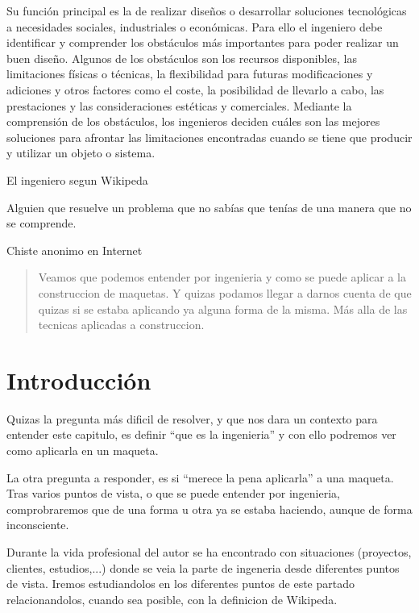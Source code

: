 

\epigraph{Su función principal es la de realizar diseños o desarrollar soluciones
    tecnológicas a necesidades sociales, industriales o económicas.
    Para ello el ingeniero debe identificar y comprender los obstáculos más importantes
    para poder realizar un buen diseño. Algunos de los obstáculos son los recursos disponibles,
    las limitaciones físicas o técnicas, la flexibilidad para futuras modificaciones y
    adiciones y otros factores como el coste, la posibilidad de llevarlo a cabo, las
    prestaciones y las consideraciones estéticas y comerciales. Mediante la comprensión de
    los obstáculos, los ingenieros deciden cuáles son las mejores soluciones para afrontar
    las limitaciones encontradas cuando se tiene que producir y utilizar un objeto o sistema.}
{El ingeniero segun Wikipeda}

\epigraph{Alguien que resuelve un problema que no sabías que tenías de una manera
    que no se comprende.}{Chiste anonimo en Internet}

\begin{abstract}
    Veamos que podemos entender por ingenieria y como se puede aplicar a la construccion
    de maquetas. Y quizas podamos llegar a darnos cuenta de que quizas si se estaba aplicando
    ya alguna forma de la misma. Más alla de las tecnicas aplicadas a construccion.
\end{abstract}

\section{Introducción}
Quizas la pregunta más dificil de resolver, y que nos dara un contexto para entender
este capitulo, es definir ``que es la ingenieria'' y con ello podremos ver como aplicarla
en un maqueta.

La otra pregunta a responder, es si ``merece la pena aplicarla'' a una maqueta. Tras varios
puntos de vista, o que se puede entender por ingenieria, comprobraremos que de una forma u
otra ya se estaba haciendo, aunque de forma inconsciente.

Durante la vida profesional del autor se ha encontrado con situaciones (proyectos, clientes,
estudios,...) donde se veia la parte de ingeneria desde diferentes puntos de vista. Iremos
estudiandolos en los diferentes puntos de este partado relacionandolos, cuando sea
posible, con la definicion de Wikipeda.

